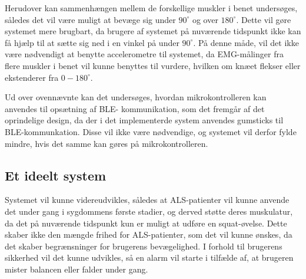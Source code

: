 \noindent
Herudover kan sammenhængen mellem de forskellige muskler i benet undersøges, således det vil være muligt at bevæge sig under $90^{\circ}$ og over $180^{\circ}$. Dette vil gøre systemet mere brugbart, da brugere af systemet på nuværende tidspunkt ikke kan få hjælp til at sætte sig ned i en vinkel på under $90^{\circ}$. På denne måde, vil det ikke være nødvendigt at benytte accelerometre til systemet, da EMG-målinger fra flere muskler i benet vil kunne benyttes til vurdere, hvilken om knæet flekser eller ekstenderer fra $0-180^{\circ}$.

Ud over ovennævnte kan det undersøges, hvordan mikrokontrolleren kan anvendes til opsætning af BLE- kommunikation, som det fremgår af det oprindelige design, da der i det implementerde system anvendes gumsticks til BLE-kommunkation. Disse vil ikke være nødvendige, og systemet vil derfor fylde mindre, hvis det samme kan gøres på mikrokontrolleren. 

\subsection{Et ideelt system}
Systemet vil kunne videreudvikles, således at ALS-patienter vil kunne anvende det under gang i sygdommens første stadier, og derved støtte deres muskulatur, da det på nuværende tidspunkt kun er muligt at udføre en squat-øvelse. Dette skaber ikke den mængde frihed for ALS-patienter, som det vil kunne ønskes, da det skaber begrænsninger for brugerens bevægelighed. I forhold til brugerens sikkerhed vil det kunne udvikles, så en alarm vil starte i tilfælde af, at brugeren mister balancen eller falder under gang. 




